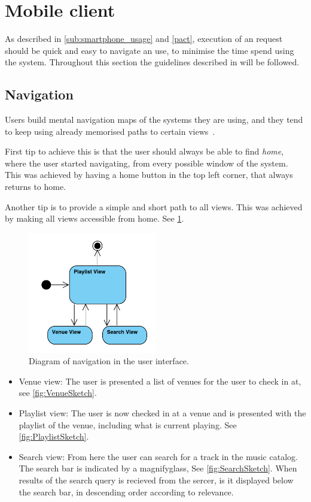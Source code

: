 \section{Mobile client}

As described in \cref{sub:smartphone_usage} and \cref{pact}, execution
of an request should be quick and easy to navigate an use, to minimise
the time spend using the system. Throughout this section the
guidelines described in  will be followed.

\subsection{Navigation}

Users build mental navigation maps of the systems they are using, and
they tend to keep using already memorised paths to certain views~\cite{DEB}.

First tip to achieve this is that the user should always be able to find \emph{home}, where the user started navigating, from every possible window of the system. This was achieved by having a home button in the top left corner, that always returns to home.

Another tip is to provide a simple and short path to all views. This
was achieved by making all views accessible from home. See \cref{fig:UserInterface}.

\begin{figure}[hbtp]
  \centering
  \includegraphics[width=0.5\textwidth]{Images/UserInterface.pdf}
  \caption{Diagram of navigation in the user interface.}\label{fig:UserInterface}
\end{figure}

\begin{itemize}
\item Venue view: The user is presented a list of venues for the user to check in at, see \cref{fig:VenueSketch}.
\item Playlist view: The user is now checked in at a venue and is presented with the playlist of the venue, including what is current playing. See \cref{fig:PlaylistSketch}.
\item Search view: From here the user can search for a track in the music catalog. The search bar is indicated by a magnifyglass, See \cref{fig:SearchSketch}. When results of the search query is recieved from the sercer, is it displayed below the search bar, in descending order according to relevance.
\end{itemize}

